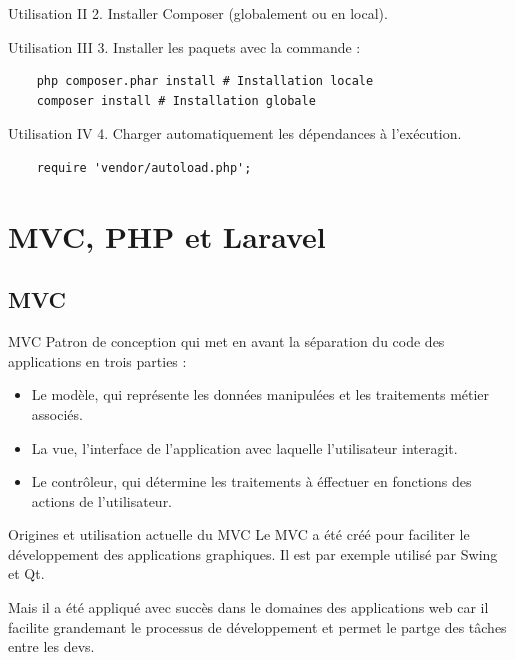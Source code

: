 \documentclass{beamer}
\begin{document}
\begin{frame}{Utilisation II}
  2. Installer Composer (globalement ou en local).
\end{frame}

\begin{frame}[fragile]{Utilisation III}
  3. Installer les paquets avec la commande :
  \begin{Verbatim}
    php composer.phar install # Installation locale
    composer install # Installation globale
  \end{Verbatim}
\end{frame}

\begin{frame}[fragile]{Utilisation IV}
  4. Charger automatiquement les dépendances à l'exécution.
  \begin{verbatim}
    require 'vendor/autoload.php';
  \end{verbatim}
\end{frame}

\section{MVC, PHP et Laravel}

\subsection{MVC}
\begin{frame}{MVC}
Patron de conception qui met en avant la séparation du code des applications en trois parties :
\begin{itemize}
  \item Le modèle, qui représente les données manipulées et les traitements métier associés.
  \item La vue, l'interface de l'application avec laquelle l'utilisateur interagit.
  \item Le contrôleur, qui détermine les traitements à éffectuer en fonctions des actions de l'utilisateur.
\end{itemize}
\end{frame}

\begin{frame}{Origines et utilisation actuelle du MVC}
Le MVC a été créé pour faciliter le développement des applications graphiques. Il est par exemple utilisé par Swing et Qt.

Mais il a été appliqué avec succès dans le domaines des applications web car il facilite grandemant le processus de développement et permet le partge des tâches entre les devs.
\end{frame}
\end{document}

